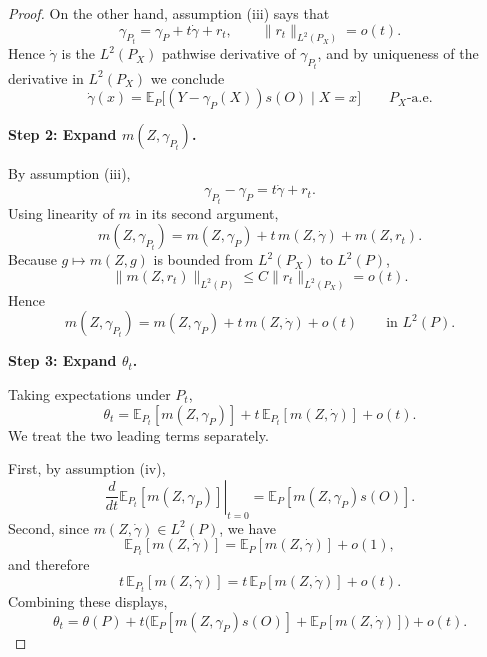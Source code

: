 \documentclass[12pt]{article}
\renewcommand{\(}{\left(}%
\renewcommand{\)}{\right)}%
\renewcommand{\[}{\left[}%
\renewcommand{\]}{\right]}%
\newtheorem{proof}{Proof.}}
\begin{document}
\begin{proof}
On the other hand, assumption (iii) says that
\begin{equation*}
\gamma_{P_t}=\gamma_P+t\dot\gamma+r_t,
\qquad
\|r_t\|_{L^2(P_X)}=o(t).
\end{equation*}
Hence $\dot\gamma$ is the $L^2(P_X)$ pathwise derivative of $\gamma_{P_t}$, and by uniqueness of the derivative in $L^2(P_X)$ we conclude
\begin{equation*}
\boxed{
\dot\gamma(x)
=
\mathbb{E}_P\big[(Y-\gamma_P(X))s(O)\mid X=x\big]
}
\qquad
P_X\text{-a.e.}
\end{equation*}

\medskip
\textbf{Step 2: Expand $m(Z,\gamma_{P_t})$.}

By assumption (iii),
\begin{equation*}
\gamma_{P_t}-\gamma_P=t\dot\gamma+r_t.
\end{equation*}
Using linearity of $m$ in its second argument,
\begin{equation*}
m(Z,\gamma_{P_t})
=
m(Z,\gamma_P)+t\,m(Z,\dot\gamma)+m(Z,r_t).
\end{equation*}
Because $g\mapsto m(Z,g)$ is bounded from $L^2(P_X)$ to $L^2(P)$,
\begin{equation*}
\|m(Z,r_t)\|_{L^2(P)}
\le C\|r_t\|_{L^2(P_X)}
=o(t).
\end{equation*}
Hence
\begin{equation*}
m(Z,\gamma_{P_t})
=
m(Z,\gamma_P)+t\,m(Z,\dot\gamma)+o(t)
\qquad
\text{in }L^2(P).
\end{equation*}

\medskip
\textbf{Step 3: Expand $\theta_t$.}

Taking expectations under $P_t$,
\begin{equation*}
\theta_t
=
\mathbb{E}_{P_t}[m(Z,\gamma_P)]
+
t\,\mathbb{E}_{P_t}[m(Z,\dot\gamma)]
+
o(t).
\end{equation*}
We treat the two leading terms separately.

First, by assumption (iv),
\begin{equation*}
\left.\frac{d}{dt}\mathbb{E}_{P_t}[m(Z,\gamma_P)]\right|_{t=0}
=
\mathbb{E}_P[m(Z,\gamma_P)s(O)].
\end{equation*}
Second, since $m(Z,\dot\gamma)\in L^2(P)$, we have
\begin{equation*}
\mathbb{E}_{P_t}[m(Z,\dot\gamma)]
=
\mathbb{E}_P[m(Z,\dot\gamma)] + o(1),
\end{equation*}
and therefore
\begin{equation*}
t\,\mathbb{E}_{P_t}[m(Z,\dot\gamma)]
=
t\,\mathbb{E}_P[m(Z,\dot\gamma)] + o(t).
\end{equation*}
Combining these displays,
\begin{equation*}
\theta_t
=
\theta(P)
+
t\Big(
\mathbb{E}_P[m(Z,\gamma_P)s(O)]
+
\mathbb{E}_P[m(Z,\dot\gamma)]
\Big)
+
o(t).
\end{equation*}


\end{proof}
\end{document}
